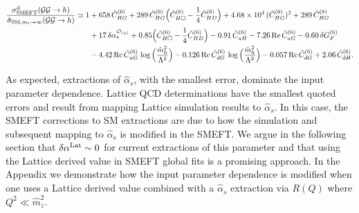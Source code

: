 \documentclass[twocolumn,nofootinbib,amsmath,amssymb,prl,aps,superscriptaddress,tightenlines,preprintnumbers]{revtex4}
\newcommand{\nn}{\nonumber}
\def\nn{\nonumber\\ }
\begin{document}
\begin{widetext}
\begin{align}
\frac{ \sigma^{\hat{\alpha}}_{\rm SMEFT}(\mathcal G\mathcal G \to h)}{\hat \sigma_{{\rm SM}, m_t \to \infty}(\mathcal G\mathcal G \to h)}\simeq 1
&  +  658\, \tilde C^{(6)}_{HG} + 289\, \tilde C^{(6)}_{HG}\Big(\tilde C^{(6)}_{H\Box} - \frac 1 4 \tilde C^{(6)}_{HD} \Big) + 4.68\times10^4\, (\tilde C^{(6)}_{HG})^2 + 289\, \tilde C^{(8)}_{HG} \nn
& + 17 \, \delta \alpha^{\mathcal{O}_{\langle a \rangle}}_s + 0.85 \Big(\tilde C^{(6)}_{H\Box} - \frac 1 4 \tilde C^{(6)}_{HD} \Big) -0.91\, \tilde C^{(6)}_{uH} - 7.26\, {\rm Re }\, \tilde C^{(6)}_{uG}
 - 0.60\,\delta G^{(6)}_F  \nn
&- 4.42\, {\rm Re }\, \tilde C^{(6)}_{uG}\,\log\Big(\frac{\hat m^2_h}{\Lambda^2} \Big) - 0.126\,{\rm Re}\,\tilde C^{(6)}_{dG}\,\log\Big(\frac{\hat m^2_h}{\Lambda^2} \Big)  -0.057\,{\rm Re}\,\tilde C^{(6)}_{dG} + 2.06\, \tilde C^{(6)}_{dH}.
\label{eq:gghrationumeric}
\end{align}
\end{widetext}
As expected, extractions of $\hat{\alpha}_s$, with the smallest error,  dominate the input parameter
dependence. Lattice QCD determinations have the smallest quoted errors and result from mapping
Lattice simulation results to $\hat{\alpha}_s$. In this case, the SMEFT corrections to SM extractions
are due to how the simulation and subsequent mapping to $\hat{\alpha}_s$ is modified in the SMEFT.
We argue in the following section that $\delta \alpha^{\rm Lat} \sim 0$ for current extractions
of this parameter and that using the Lattice derived value in SMEFT global fits is a promising approach.
In the Appendix we demonstrate how the input parameter dependence is modified when one uses
a Lattice derived value combined with a $\hat{\alpha}_s$ extraction via $R(Q)$ where $Q^2 \ll \hat{m}_z^2$.
\end{document}
